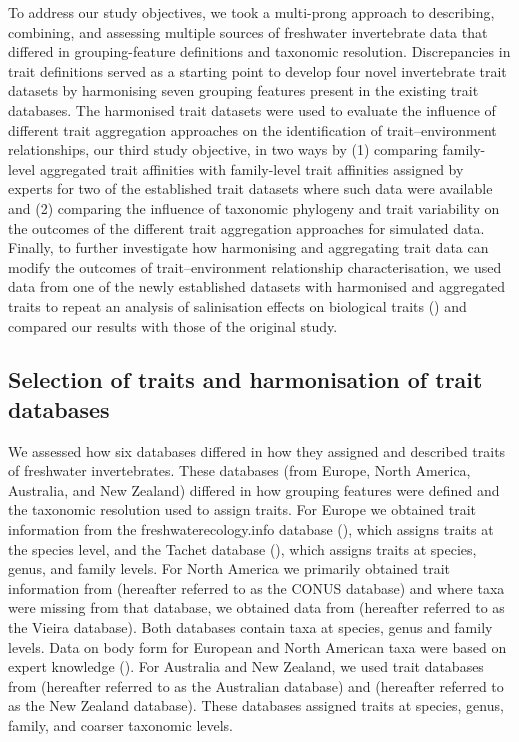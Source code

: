 \documentclass[12pt]{article}
\begin{document}
To address our study objectives, we took a multi-prong approach to describing, combining, and assessing multiple sources of freshwater invertebrate data that differed in grouping-feature definitions and taxonomic resolution. Discrepancies in trait definitions served as a starting point to develop four novel invertebrate trait datasets by harmonising seven grouping features present in the existing trait databases. The harmonised trait datasets were used to evaluate the influence of different trait aggregation approaches on the identification of trait–environment relationships, our third study objective, in two ways by (1) comparing family-level aggregated trait affinities with family-level trait affinities assigned by experts for two of the established trait datasets where such data were available and (2) comparing the influence of taxonomic phylogeny and trait variability on the outcomes of the different trait aggregation approaches for simulated data. Finally, to further investigate how harmonising and aggregating trait data can modify the outcomes of trait–environment relationship characterisation, we used data from one of the newly established datasets with harmonised and aggregated traits to repeat an analysis of salinisation effects on biological traits (\cite{szocs_effects_2014}) and compared our results with those of the original study.

\subsection*{Selection of traits and harmonisation of trait databases}

We assessed how six databases differed in how they assigned and described traits of freshwater invertebrates. These databases (from Europe, North America, Australia, and New Zealand) differed in how grouping features were defined and the taxonomic resolution used to assign traits. For Europe we obtained trait information from the freshwaterecology.info database (\cite{schmidt-kloiber_www.freshwaterecology.info_2015}), which assigns traits at the species level, and the Tachet database (\cite{ussegliopolatera_biological_2000}), which assigns traits at species, genus, and family levels. For North America we primarily obtained trait information from \citet{twardochleb_freshwater_nodate} (hereafter referred to as the CONUS database) and where taxa were missing from that database, we obtained data from \citet{vieira_database_nodate} (hereafter referred to as the Vieira database). Both databases contain taxa at species, genus and family levels. Data on body form for European and North American taxa were based on expert knowledge (\cite{polatera_personal_information_2020}). For Australia and New Zealand, we used trait databases from \citet{kefford_integrated_2020} (hereafter referred to as the Australian database) and \citet{Philips_and_Smith_NZ_DB_2018} (hereafter referred to as the New Zealand database). These databases assigned traits at species, genus, family, and coarser taxonomic levels.
\end{document}
